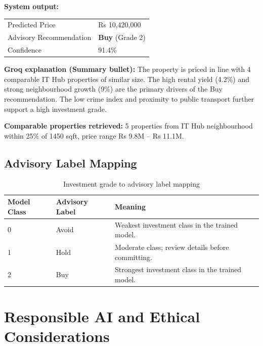 \documentclass[12pt,a4paper]{article}
\begin{document}
\begin{resultbox}
\textbf{System output:}

\begin{tabular}{ll}
Predicted Price        & Rs 10,420,000 \\
Advisory Recommendation & \textbf{Buy} (Grade 2) \\
Confidence             & 91.4\% \\
\end{tabular}

\vspace{0.5em}
\textbf{Groq explanation (Summary bullet):} The property is priced in line with 4 comparable IT Hub properties of similar size. The high rental yield (4.2\%) and strong neighbourhood growth (9\%) are the primary drivers of the Buy recommendation. The low crime index and proximity to public transport further support a high investment grade.

\vspace{0.5em}
\textbf{Comparable properties retrieved:} 5 properties from IT Hub neighbourhood within 25\% of 1450 sqft, price range Rs 9.8M -- Rs 11.1M.
\end{resultbox}

\subsection{Advisory Label Mapping}

\begin{table}[H]
\centering
\caption{Investment grade to advisory label mapping}
\begin{tabular}{lll}
\toprule
\textbf{Model Class} & \textbf{Advisory Label} & \textbf{Meaning} \\
\midrule
0 & Avoid & Weakest investment class in the trained model. \\
1 & Hold  & Moderate class; review details before committing. \\
2 & Buy   & Strongest investment class in the trained model. \\
\bottomrule
\end{tabular}
\end{table}

\section{Responsible AI and Ethical Considerations}
\end{document}
